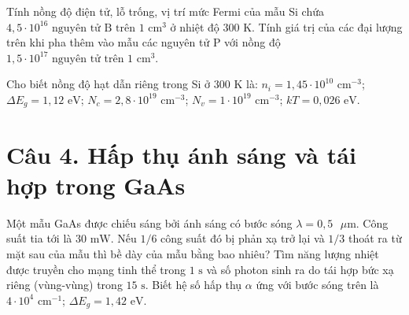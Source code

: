 \documentclass[11pt,a4paper]{article}
\begin{document}
Tính nồng độ điện tử, lỗ trống, vị trí mức Fermi của mẫu Si chứa $4{,}5 \cdot 10^{16}\text{ nguyên tử B trên } 1\text{ cm}^3$ ở nhiệt độ $300\text{ K}$. Tính giá trị của các đại lượng trên khi pha thêm vào mẫu các nguyên tử P với nồng độ $1{,}5 \cdot 10^{17}\text{ nguyên tử trên } 1\text{ cm}^3$.

Cho biết nồng độ hạt dẫn riêng trong Si ở $300\text{ K}$ là: $n_i = 1{,}45 \cdot 10^{10}\text{ cm}^{-3}$; $\Delta E_g = 1{,}12\text{ eV}$; $N_c = 2{,}8 \cdot 10^{19}\text{ cm}^{-3}$; $N_v = 1 \cdot 10^{19}\text{ cm}^{-3}$; $kT = 0{,}026\text{ eV}$.

\vspace{0.5cm}

\section*{Câu 4. Hấp thụ ánh sáng và tái hợp trong GaAs}

Một mẫu GaAs được chiếu sáng bởi ánh sáng có bước sóng $\lambda = 0{,}5\text{ }\mu\text{m}$. Công suất tia tới là $30\text{ mW}$. Nếu $1/6$ công suất đó bị phản xạ trở lại và $1/3$ thoát ra từ mặt sau của mẫu thì bề dày của mẫu bằng bao nhiêu? Tìm năng lượng nhiệt được truyền cho mạng tinh thể trong $1\text{ s}$ và số photon sinh ra do tái hợp bức xạ riêng (vùng-vùng) trong $15\text{ s}$. Biết hệ số hấp thụ $\alpha$ ứng với bước sóng trên là $4 \cdot 10^4\text{ cm}^{-1}$; $\Delta E_g = 1{,}42\text{ eV}$.
\end{document}
